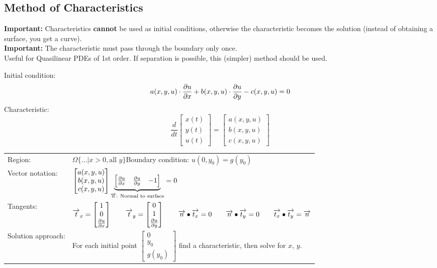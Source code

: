 
\subsection{Method of Characteristics}

\textbf{Important:} Characteristics \textbf{cannot} be used as initial conditions, otherwise the characteristic becomes the solution (instead of obtaining a surface, you get a curve).\\
\textbf{Important:} The characteristic must pass through the boundary only once.\\
Useful for Quasilinear PDEs of 1st order. If separation is possible, this (simpler) method should be used.

Initial condition:
\[
    a(x,y,u)\cdot\frac{\partial u}{\partial x}+b(x,y,u)\cdot\frac{\partial u}{\partial y}-c(x,y,u)=0
\]
Characteristic:
\[
    \frac{d}{dt} \begin{bmatrix} x(t) \\ y(t) \\ u(t) \end{bmatrix}
    = \begin{bmatrix} a(x,y,u) \\ b(x,y,u) \\ c(x,y,u) \end{bmatrix}
\]


\begin{tabular}{ll}
Region:& $\Omega\{\ldots|x>0, \text{all }y\}$\qquad Boundary condition: $u(0,y_0)=g(y_0)$\\
Vector notation:& $\begin{bmatrix}
    a(x,y,u)\\ b(x,y,u)\\ c(x,y,u)
    \end{bmatrix}
\underset{\overrightarrow{n}\text{: Normal to surface}}{\underbrace{\begin{bmatrix}
\frac{\partial u}{\partial x} & \frac{\partial u}{\partial y} & -1
\end{bmatrix}}}=0 $ \\[1cm]
Tangents:& $\overrightarrow{t}_x=\begin{bmatrix}1\\0\\ \frac{\partial u}{\partial x}\end{bmatrix}\qquad
			\overrightarrow{t}_y=\begin{bmatrix}0\\1\\ \frac{\partial u}{\partial y}\end{bmatrix}\qquad \overrightarrow{n} \bullet \overrightarrow{t_x} = 0 \qquad \overrightarrow{n} \bullet \overrightarrow{t_y} = 0 \qquad \overrightarrow{t_x} \bullet \overrightarrow{t_y} = \overrightarrow{n}$\\[1cm]

Solution approach: & For each initial point $\begin{bmatrix} 0\\y_0\\g(y_0)\end{bmatrix}$ find a characteristic, then solve for $x$, $y$.
\end{tabular}

